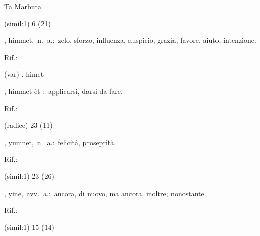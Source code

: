 \begin{glossario}{Ta Marbuta}
\begin{subvocedue}
\item[(simil:1)]   6 (21)
\end{subvocedue}
\item[{\color{colorlowref}\spzrl{himmaT}},] {\sf himmet},\ n.\ a.:\ zelo,   sforzo,   influenza,   auspicio, grazia, favore, aiuto, intenzione.
\begin{subvocedue}
\item[Rif.:] 
\end{subvocedue}
\begin{subvocedue}
\item[(var)] , {\sf himet}\item[\subglossariobullet] , {\sf himmet ėt-}:\ applicarsi, darsi da fare.
\begin{subvocedue}
\item[Rif.:] 
\end{subvocedue}
\item[(radice)]   23 (11)
\end{subvocedue}
\item[{\color{colorlowref}\spzrl{yumn.H}},] {\sf yumnet},\ n.\ a.:\ felicità, proseprità.
\begin{subvocedue}
\item[Rif.:] 
\end{subvocedue}
\begin{subvocedue}
\item[(simil:1)]   23 (26)
\end{subvocedue}
\item[{\color{colorlowref}\spzrl{yin.H}},] {\sf yine},\ avv.\ a.:\ ancora, di nuovo, ma ancora, inoltre; nonostante.
\begin{subvocedue}
\item[Rif.:] 
\end{subvocedue}
\begin{subvocedue}
\item[(simil:1)]   15 (14)
\end{subvocedue}
\end{glossario}
